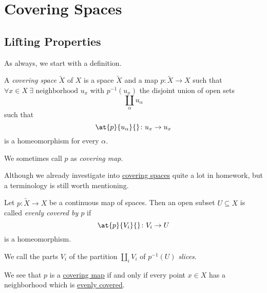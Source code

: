 \chapter{Covering Spaces}
\section{Lifting Properties}
As always, we start with a definition.
\begin{definition}\label{def:covering-space}\label{def:covering-map}
	A \emph{covering space} \(\widetilde{X} \) of \(X\) is a space \(\widetilde{X} \) and a map \(p\colon \widetilde{X} \to X\)
	such that \(\forall x\in X\ \exists \text{ neighborhood } u_{x}\) with \(p^{-1} (u_{x})\) the disjoint union of open sets
	\[
		\coprod_\alpha u_\alpha
	\]
	such that
	\[
		\at{p}{u_\alpha }{} \colon u_{x}\to u_{x}
	\]
	is a homeomorphism for every \(\alpha \).
	\begin{figure}[H]
		\centering
		\label{fig:def:covering-space}
	\end{figure}
	We sometimes call \(p\) as \emph{covering map}.
\end{definition}

Although we already investigate into \hyperref[def:covering-space]{covering spaces} quite a lot in homework, but a terminology is still
worth mentioning.
\begin{definition}\label{def:evenly-covered}
	Let \(p\colon \widetilde{X} \to X\) be a continuous map of spaces. Then an open subset \(U\subseteq X\) is called \emph{evenly covered by \(p\) }
	if
	\[
		\at{p}{V_{i}}{} \colon V_{i}\to U
	\]
	is a homeomorphism.

	\par We call the parts \(V_{i}\) of the partition \(\coprod_i V_{i}\) of \(p^{-1} (U)\) \emph{slices}.
\end{definition}
\begin{remark}
	We see that \(p\) is a \hyperref[def:covering-map]{covering map} if and only if every point \(x\in X\) has a neighborhood which is
	\hyperref[def:evenly-covered]{evenly covered}.
\end{remark}

